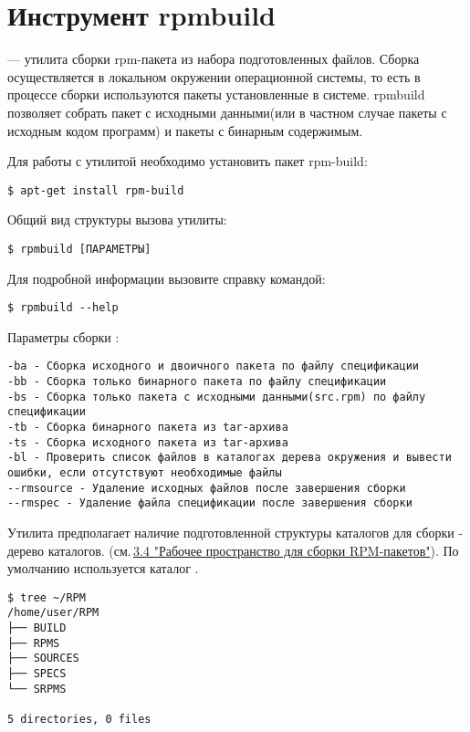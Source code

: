 \hypertarget{rpmbuild}{\chapter{Инструмент rpmbuild}}\label{chapter-rpmbuild}


 --- утилита сборки rpm-пакета из набора подготовленных файлов. Сборка осуществляется
в локальном окружении операционной системы, то есть в процессе сборки используются пакеты
установленные в системе. rpmbuild позволяет собрать пакет с исходными данными(или в частном
случае пакеты с исходным кодом программ) и пакеты с бинарным содержимым.

Для работы с утилитой необходимо установить пакет rpm-build:

\begin{verbatim}
$ apt-get install rpm-build
\end{verbatim}

Общий вид структуры вызова утилиты:

\begin{verbatim}
$ rpmbuild [ПАРАМЕТРЫ]
\end{verbatim}

Для подробной информации вызовите справку командой:

\begin{verbatim}
$ rpmbuild --help
\end{verbatim}

Параметры сборки :
\begin{verbatim}
-ba - Сборка исходного и двоичного пакета по файлу спецификации
-bb - Cборка только бинарного пакета по файлу спецификации
-bs - Cборка только пакета c исходными данными(src.rpm) по файлу спецификации
-tb - Сборка бинарного пакета из tar-архива
-ts - Сборка исходного пакета из tar-архива
-bl - Проверить список файлов в каталогах дерева окружения и вывести ошибки, если отсутствуют необходимые файлы
--rmsource - Удаление исходных файлов после завершения сборки
--rmspec - Удаление файла спецификации после завершения сборки
\end{verbatim}

Утилита предполагает наличие подготовленной структуры каталогов для сборки - дерево каталогов.
(см.\,\hyperlink{3.4}{3.4 "Рабочее пространство для сборки RPM-пакетов"}). По умолчанию используется
каталог .

\begin{verbatim}
$ tree ~/RPM
/home/user/RPM
├── BUILD
├── RPMS
├── SOURCES
├── SPECS
└── SRPMS

5 directories, 0 files
\end{verbatim}

